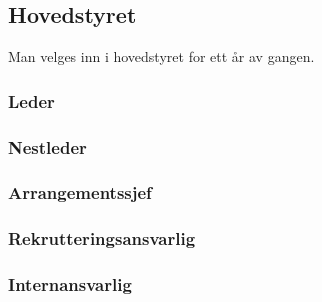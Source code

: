 \documentclass[10pt,norsk,a4paper]{article}
\begin{document}
\begin{minipage}[t]{0.49\textwidth}
\subsection{Hovedstyret}
Man velges inn i hovedstyret for ett år av gangen.

\subsubsection{Leder}
\subsubsection{Nestleder}
\subsubsection{Arrangementssjef}
\subsubsection{Rekrutteringsansvarlig}
\subsubsection{Internansvarlig}

\end{minipage}
\end{document}
